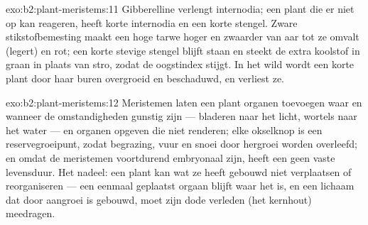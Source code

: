 \begin{solution}{exo:b2:plant-meristems:11}
Gibberelline verlengt internodia; een plant die er niet op kan reageren,
heeft korte internodia en een korte stengel. Zware stikstofbemesting maakt
een hoge tarwe hoger en zwaarder van aar tot ze omvalt (legert) en rot; een
korte stevige stengel blijft staan en steekt de extra koolstof in graan
in plaats van stro, zodat de oogstindex stijgt. In het wild wordt een korte
plant door haar buren overgroeid en beschaduwd, en verliest ze.
\end{solution}

\begin{solution}{exo:b2:plant-meristems:12}
Meristemen laten een plant organen toevoegen waar en wanneer de
omstandigheden gunstig zijn --- bladeren naar het licht, wortels naar het
water --- en organen opgeven die niet renderen; elke okselknop is een
reservegroeipunt, zodat begrazing, vuur en snoei door hergroei worden
overleefd; en omdat de meristemen voortdurend embryonaal zijn, heeft een
 geen vaste levensduur. Het nadeel: een plant kan wat ze heeft gebouwd
niet verplaatsen of reorganiseren --- een eenmaal geplaatst orgaan blijft
waar het is, en een lichaam dat door aangroei is gebouwd, moet zijn dode
verleden (het kernhout) meedragen.
\end{solution}

